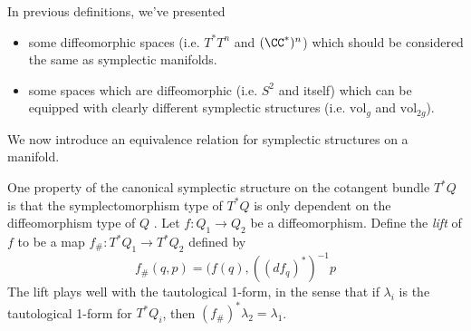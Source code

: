 
In previous definitions, we've presented 
\begin{itemize}
    \item some diffeomorphic spaces (i.e. $T^*T^n$ and $(\CC^*)^n$) which should be considered the same as symplectic manifolds.
    \item some spaces which are diffeomorphic (i.e. $S^2$ and itself) which can be equipped with clearly different symplectic structures (i.e. $\text{vol}_g$ and $\text{vol}_{2g}$).
\end{itemize} 
We now introduce an equivalence relation for symplectic structures on a manifold.

One property of the canonical symplectic structure on the cotangent bundle $T^*Q$ is that the symplectomorphism type of $T^*Q$ is only dependent on the diffeomorphism type of $Q$ \cite{da2001lectures}.
Let $f: Q_1\to Q_2$ be a diffeomorphism. 
Define the \emph{lift} of $f$ to be a map $f_\#: T^*Q_1\to T^* Q_2$ defined by
\[f_\#(q,p)=(f(q),  ((df_q)^*)^{-1}p\]
The lift plays well with the tautological 1-form, in the sense that if $\lambda_i$ is the tautological 1-form for $T^*Q_i$, then $(f_\#)^*\lambda_2=\lambda_1$. 
    

